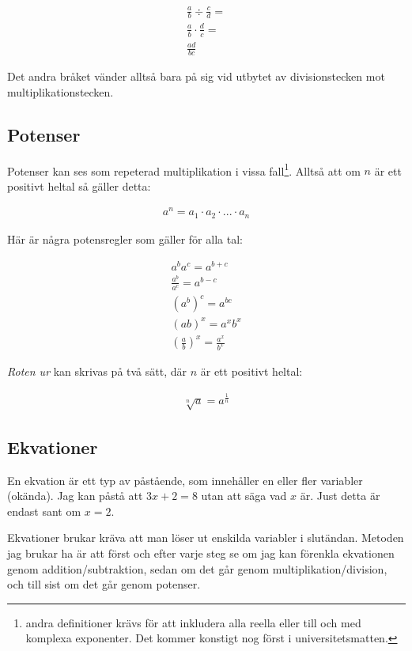 \begin{align}
	\frac{a}{b} \div\frac{c}{d} = \\ 
	\frac{a}{b} \cdot \frac{d}{c} = \\
	\frac{ad}{bc}
\end{align}

Det andra bråket vänder alltså bara på sig vid utbytet av divisionstecken mot multiplikationstecken.

\newpage
\subsection{Potenser}
\label{Potenser}

Potenser kan ses som repeterad multiplikation i vissa fall\footnote{andra definitioner krävs för att inkludera alla reella eller till och med komplexa exponenter. Det kommer konstigt nog först i universitetsmatten.}. Alltså att om $n$ är ett positivt heltal så gäller detta:

\begin{align}
	a^n = a_1 \cdot a_2 \cdot ... \cdot a_n
\end{align}

Här är några potensregler som gäller för alla tal:

\begin{align}
	a^ba^c = a^{b+c} \\
	\frac{a^b}{a^c} = a^{b-c} \\
	(a^b)^c=a^{bc} \\
	(ab)^x=a^xb^x \\
	\left(\frac{a}{b}\right)^x=\frac{a^x}{b^x}
\end{align}

\textit{Roten ur} kan skrivas på två sätt, där $n$ är ett positivt heltal:

\begin{align}
	\sqrt[n]{a} = a^{\frac{1}{n}}
\end{align}

\newpage
\subsection{Ekvationer}

En ekvation är ett typ av påstående, som innehåller en eller fler variabler (okända). Jag kan påstå att $3x+2 = 8$ utan att säga vad $x$ är. Just detta är endast sant om $x=2$.

Ekvationer brukar kräva att man löser ut enskilda variabler i slutändan. Metoden jag brukar ha är att först och efter varje steg se om jag kan förenkla ekvationen genom addition/subtraktion, sedan om det går genom multiplikation/division, och till sist om det går genom potenser.

